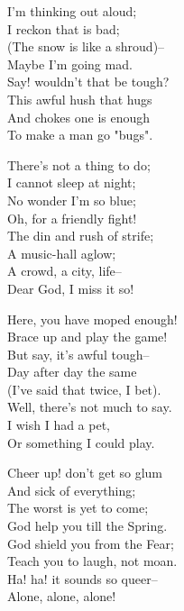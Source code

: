 \begin{poemblock}
I'm thinking out aloud;\\
\idt I reckon that is bad;\\
(The snow is like a shroud)--\\
\idt Maybe I'm going mad.\\
Say! wouldn't that be tough?\\
\idt This awful hush that hugs\\
And chokes one is enough\\
\idt To make a man go "bugs".

There's not a thing to do;\\
\idt I cannot sleep at night;\\
No wonder I'm so blue;\\
\idt Oh, for a friendly fight!\\
The din and rush of strife;\\
\idt A music-hall aglow;\\
A crowd, a city, life--\\
\idt Dear God, I miss it so!

Here, you have moped enough!\\
\idt Brace up and play the game!\\
But say, it's awful tough--\\
\idt Day after day the same\\
(I've said that twice, I bet).\\
\idt Well, there's not much to say.\\
I wish I had a pet,\\
\idt Or something I could play.

Cheer up! don't get so glum\\
\idt And sick of everything;\\
The worst is yet to come;\\
\idt God help you till the Spring.\\
God shield you from the Fear;\\
\idt Teach you to laugh, not moan.\\
Ha! ha! it sounds so queer--\\
\idt Alone, alone, alone!

\end{poemblock}
